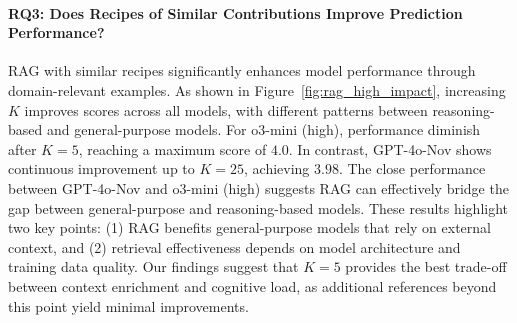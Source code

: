 \paragraph*{RQ3: Does Recipes of Similar Contributions Improve Prediction Performance?}
RAG with similar recipes significantly enhances model performance through domain-relevant examples. As shown in Figure~\ref{fig:rag_high_impact}, increasing \(K\) improves scores across all models, with different patterns between reasoning-based and general-purpose models.
For o3-mini (high), performance diminish after \(K=5\), reaching a maximum score of \(4.0\). In contrast, GPT-4o-Nov shows continuous improvement up to \(K=25\), achieving \(3.98\). The close performance between GPT-4o-Nov and o3-mini (high) suggests RAG can effectively bridge the gap between general-purpose and reasoning-based models.
These results highlight two key points: (1) RAG benefits general-purpose models that rely on external context, and (2) retrieval effectiveness depends on model architecture and training data quality. Our findings suggest that \(K=5\) provides the best trade-off between context enrichment and cognitive load, as additional references beyond this point yield minimal improvements.






